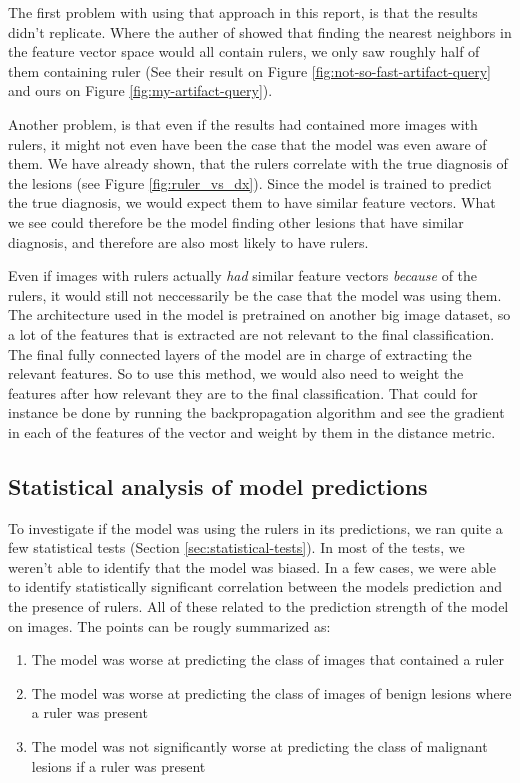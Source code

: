 The first problem with using that approach in this report, is that the results didn't replicate.
Where the auther of \cite{debias-not-so-fast} showed that finding the nearest neighbors in the feature
vector space would all contain rulers, we only saw roughly half of them containing ruler 
(See their result on Figure \ref{fig:not-so-fast-artifact-query} and ours on Figure \ref{fig:my-artifact-query}).

Another problem, is that even if the results had contained more images with rulers,
it might not even have been the case that the model was even aware of them.
We have already shown, that the rulers correlate with the true diagnosis of the lesions (see Figure \ref{fig:ruler_vs_dx}).
Since the model is trained to predict the true diagnosis, we would expect them to have similar feature vectors.
What we see could therefore be the model finding other lesions that have similar diagnosis,
and therefore are also most likely to have rulers.

Even if images with rulers actually \textit{had} similar feature vectors \textit{because} of the rulers,
it would still not neccessarily be the case that the model was using them.
The architecture used in the model is pretrained on another big image dataset,
so a lot of the features that is extracted are not relevant to the final classification. 
The final fully connected layers of the model are in charge of extracting the relevant features.
So to use this method, we would also need to weight the features after how relevant they are to
the final classification.
That could for instance be done by running the backpropagation algorithm and see the
gradient in each of the features of the vector and weight by them in the distance metric.

\subsection{Statistical analysis of model predictions}
To investigate if the model was using the rulers in its predictions, 
we ran quite a few statistical tests (Section \ref{sec:statistical-tests}).
In most of the tests, we weren't able to identify that the model was biased.
In a few cases, we were able to identify statistically significant correlation between
the models prediction and the presence of rulers.
All of these related to the prediction strength of the model on images.
The points can be rougly summarized as:
\begin{enumerate}
    \item The model was worse at predicting the class of images that contained a ruler
    \item The model was worse at predicting the class of images of benign lesions where a ruler was present 
    \item The model was not significantly worse at predicting the class of malignant lesions if a ruler was present
\end{enumerate}

